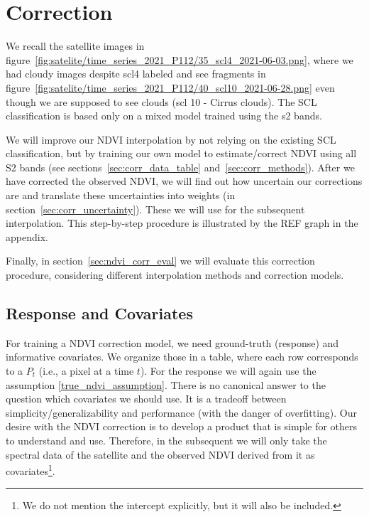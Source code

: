 \section{Correction}{
    {
        We recall the satellite images in figure~\ref{fig:satelite/time_series_2021_P112/35_scl4_2021-06-03.png}, where we had cloudy images despite scl4 labeled and see fragments in figure~\ref{fig:satelite/time_series_2021_P112/40_scl10_2021-06-28.png} even though we are supposed to see clouds (scl 10 - Cirrus clouds). The SCL classification is based only on a mixed model trained using the s2 bands. 
        
        We will improve our NDVI interpolation by not relying on the existing SCL classification, but by training our own model to estimate/correct NDVI using all S2 bands (see sections~\ref{sec:corr_data_table} and~\ref{sec:corr_methods}). After we have corrected the observed NDVI, we will find out how uncertain our corrections are and translate these uncertainties into weights (in section~\ref{sec:corr_uncertainty}). These we will use for the subsequent interpolation. This step-by-step procedure is illustrated by the REF graph in the appendix.

        Finally, in section~\ref{sec:ndvi_corr_eval} we will evaluate this correction procedure, considering different interpolation methods and correction models.
    }

    \subsection{Response and Covariates}{
        \label{sec:corr_data_table}

        For training a NDVI correction model, we need ground-truth (response) and informative covariates. We organize those in a table, where each row corresponds to a $P_t$ (i.e., a pixel at a time $t$). 
        For the response we will again use the assumption \ref{true_ndvi_assumption}. There is no canonical answer to the question which covariates we should use. It is a tradeoff between simplicity/generalizability and performance (with the danger of overfitting). 
        Our desire with the NDVI correction is to develop a product that is simple for others to understand and use. Therefore, in the subsequent we will only take the spectral data of the satellite and the observed NDVI derived from it as covariates\footnote{We do not mention the intercept explicitly, but it will also be included.}.  
    }    

}
